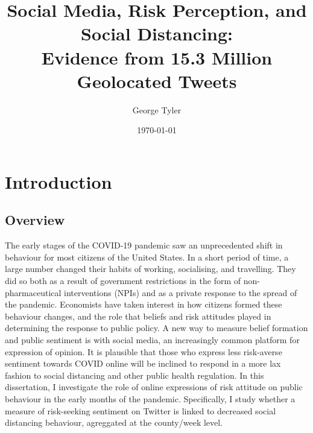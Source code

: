 \documentclass{article}
\author{George Tyler}
\date{\today}
\begin{document}
\title{Social Media, Risk Perception, and Social Distancing: \\ Evidence from 15.3 Million Geolocated Tweets}

\maketitle

\section{Introduction}
\subsection{Overview}
The early stages of the COVID-19 pandemic saw an unprecedented shift in behaviour for most citizens of the United States. In a short period of time, a large number changed their habits of working, socialising, and travelling. They did so both as a result of government restrictions in the form of non-pharmaceutical interventions (NPIs) and as a private response to the spread of the pandemic. Economists have taken interest in how citizens formed these behaviour changes, and the role that beliefs and risk attitudes played in determining the response to public policy. A new way to measure belief formation and public sentiment is with social media, an increasingly common platform for expression of opinion. It is plausible that those who express less risk-averse sentiment towards COVID online will be inclined to respond in a more lax fashion to social distancing and other public health regulation. In this dissertation, I investigate the role of online expressions of risk attitude on public behaviour in the early months of the pandemic. Specifically, I study whether a measure of risk-seeking sentiment on Twitter is linked to decreased social distancing behaviour, agreggated at the county/week level. 
\end{document}
